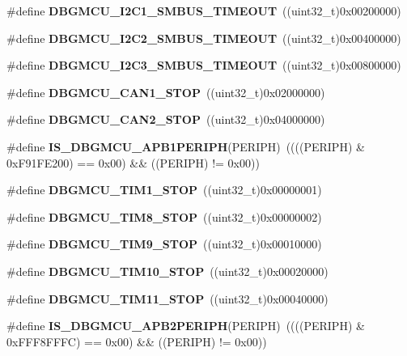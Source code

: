 \begin{DoxyCompactItemize}
\#define \textbf{ D\+B\+G\+M\+C\+U\+\_\+\+I2\+C1\+\_\+\+S\+M\+B\+U\+S\+\_\+\+T\+I\+M\+E\+O\+UT}~((uint32\+\_\+t)0x00200000)
\item 
\#define \textbf{ D\+B\+G\+M\+C\+U\+\_\+\+I2\+C2\+\_\+\+S\+M\+B\+U\+S\+\_\+\+T\+I\+M\+E\+O\+UT}~((uint32\+\_\+t)0x00400000)
\item 
\#define \textbf{ D\+B\+G\+M\+C\+U\+\_\+\+I2\+C3\+\_\+\+S\+M\+B\+U\+S\+\_\+\+T\+I\+M\+E\+O\+UT}~((uint32\+\_\+t)0x00800000)
\item 
\#define \textbf{ D\+B\+G\+M\+C\+U\+\_\+\+C\+A\+N1\+\_\+\+S\+T\+OP}~((uint32\+\_\+t)0x02000000)
\item 
\#define \textbf{ D\+B\+G\+M\+C\+U\+\_\+\+C\+A\+N2\+\_\+\+S\+T\+OP}~((uint32\+\_\+t)0x04000000)
\item 
\#define \textbf{ I\+S\+\_\+\+D\+B\+G\+M\+C\+U\+\_\+\+A\+P\+B1\+P\+E\+R\+I\+PH}(P\+E\+R\+I\+PH)~((((P\+E\+R\+I\+PH) \& 0x\+F91\+F\+E200) == 0x00) \&\& ((\+P\+E\+R\+I\+P\+H) != 0x00))
\item 
\#define \textbf{ D\+B\+G\+M\+C\+U\+\_\+\+T\+I\+M1\+\_\+\+S\+T\+OP}~((uint32\+\_\+t)0x00000001)
\item 
\#define \textbf{ D\+B\+G\+M\+C\+U\+\_\+\+T\+I\+M8\+\_\+\+S\+T\+OP}~((uint32\+\_\+t)0x00000002)
\item 
\#define \textbf{ D\+B\+G\+M\+C\+U\+\_\+\+T\+I\+M9\+\_\+\+S\+T\+OP}~((uint32\+\_\+t)0x00010000)
\item 
\#define \textbf{ D\+B\+G\+M\+C\+U\+\_\+\+T\+I\+M10\+\_\+\+S\+T\+OP}~((uint32\+\_\+t)0x00020000)
\item 
\#define \textbf{ D\+B\+G\+M\+C\+U\+\_\+\+T\+I\+M11\+\_\+\+S\+T\+OP}~((uint32\+\_\+t)0x00040000)
\item 
\#define \textbf{ I\+S\+\_\+\+D\+B\+G\+M\+C\+U\+\_\+\+A\+P\+B2\+P\+E\+R\+I\+PH}(P\+E\+R\+I\+PH)~((((P\+E\+R\+I\+PH) \& 0x\+F\+F\+F8\+F\+F\+F\+C) == 0x00) \&\& ((\+P\+E\+R\+I\+P\+H) != 0x00))
\end{DoxyCompactItemize}
